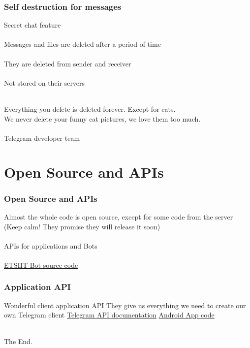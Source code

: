 \documentclass{beamer}
\begin{document}
\begin{frame}
\frametitle{Self destruction for messages}
Secret chat feature\\~\\
Messages and files are deleted after a period of time\\~\\
They are deleted from sender and receiver\\~\\
Not stored on their servers\\~\\
\begin{center}
Everything you delete is deleted forever. Except for cats.\\
We never delete your funny cat pictures, we love them too much.\\~\\
Telegram developer team
\end{center}
\end{frame}

\section{Open Source and APIs}

\begin{frame}
\frametitle{Open Source and APIs}
Almost the whole code is open source, except for some code from the server (Keep calm! They promise they will release it soon)\\~\\
APIs for applications and Bots\\~\\
\href{https://github.com/acasadoquijada/ETSIIT_BOT}{\color{blue}ETSIIT Bot source code}
\end{frame}


\begin{frame}
\frametitle{Application API}
Wonderful client application API
They give us everything we need to create our own Telegram client
\href{https://core.telegram.org/#telegram-api}{\color{blue}Telegram API documentation}
\href{https://github.com/DrKLO/Telegram}{\color{blue}Android App code}\\~\\
\end{frame}

\begin{frame}
\Huge{\centerline{The End.}}
\end{frame}

\end{document}

